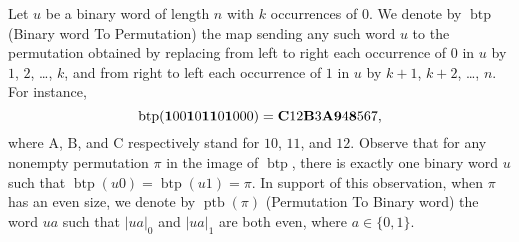 \documentclass[a4paper]{llncs}
\DeclareMathOperator{\BINTOPERM}{\mathrm{btp}}
\DeclareMathOperator{\PERMTOBIN}{\mathrm{ptb}}
\begin{document}
Let $u$ be a binary word of length $n$ with $k$ occurrences of $0$.
We denote by $\BINTOPERM$ (Binary word To Permutation) the map sending 
any such word $u$ to the permutation obtained by replacing from left to 
right each occurrence of $0$ in $u$ by $1$, $2$, \dots, $k$, and from 
right to left each occurrence of $1$ in $u$ by $k + 1$, $k + 2$, \dots, $n$.
For instance,
\begin{equation}
    \BINTOPERM({\bf 1}00{\bf 1}0{\bf 1}{\bf 1}0{\bf 1}000) =
    {\bf C} 12 {\bf B} 3 {\bf A} {\bf 9} 4 {\bf 8} 567,
\end{equation}
where $\mathrm{A}$, $\mathrm{B}$, and $\mathrm{C}$ respectively stand 
for $10$, $11$, and $12$. Observe that for any nonempty permutation 
$\pi$ in the image of $\BINTOPERM$, there is exactly one binary word $u$ 
such that $\BINTOPERM(u0) = \BINTOPERM(u1) = \pi$. In support of this
observation, when $\pi$ has an even size, we denote by $\PERMTOBIN(\pi)$
(Permutation To Binary word) the word $ua$ such that $|ua|_0$ and $|ua|_1$ 
are both even, where $a \in \{0, 1\}$.
\end{document}
